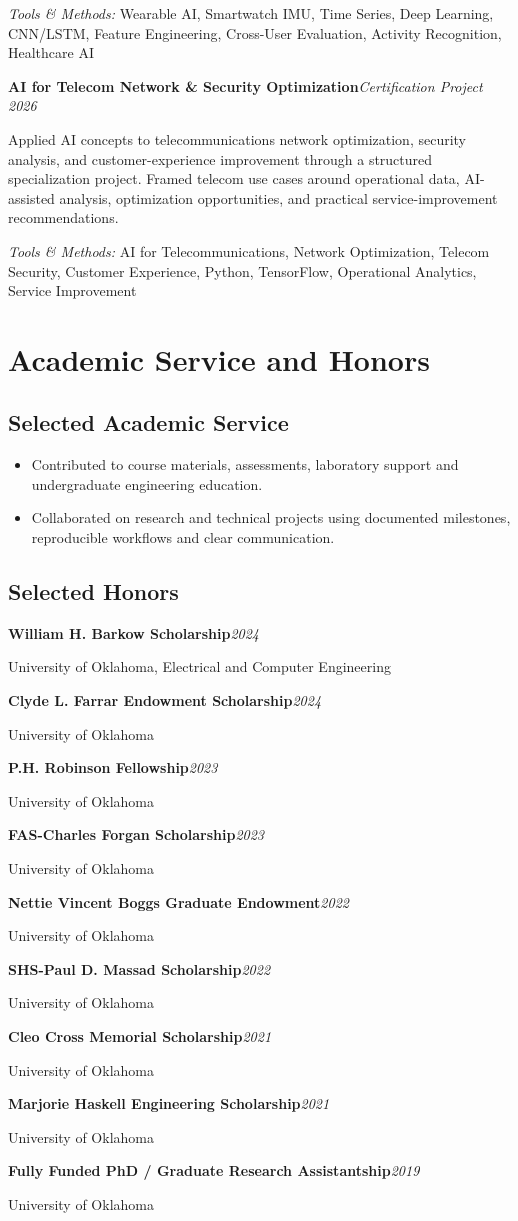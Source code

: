 \documentclass[8pt,letterpaper]{extarticle}
\newcommand{\entry}[2]{\Needspace{4\baselineskip}\textbf{#1}\hfill\textit{#2}\par}
\begin{document}
{\small\textit{Tools \& Methods:} Wearable AI, Smartwatch IMU, Time Series, Deep Learning, CNN/LSTM, Feature Engineering, Cross-User Evaluation, Activity Recognition, Healthcare AI\par}
\vspace{1pt}
\entry{AI for Telecom Network \& Security Optimization}{Certification Project \textbar{} 2026}
Applied AI concepts to telecommunications network optimization, security analysis, and customer-experience improvement through a structured specialization project. Framed telecom use cases around operational data, AI-assisted analysis, optimization opportunities, and practical service-improvement recommendations.\par
{\small\textit{Tools \& Methods:} AI for Telecommunications, Network Optimization, Telecom Security, Customer Experience, Python, TensorFlow, Operational Analytics, Service Improvement\par}
\vspace{1pt}
\section{Academic Service and Honors}
\subsection{Selected Academic Service}
\begin{itemize}
\item Contributed to course materials, assessments, laboratory support and undergraduate engineering education.
\item Collaborated on research and technical projects using documented milestones, reproducible workflows and clear communication.
\end{itemize}
\subsection{Selected Honors}
\entry{William H. Barkow Scholarship}{2024}
{\small University of Oklahoma, Electrical and Computer Engineering\par}
\entry{Clyde L. Farrar Endowment Scholarship}{2024}
{\small University of Oklahoma\par}
\entry{P.H. Robinson Fellowship}{2023}
{\small University of Oklahoma\par}
\entry{FAS-Charles Forgan Scholarship}{2023}
{\small University of Oklahoma\par}
\entry{Nettie Vincent Boggs Graduate Endowment}{2022}
{\small University of Oklahoma\par}
\entry{SHS-Paul D. Massad Scholarship}{2022}
{\small University of Oklahoma\par}
\entry{Cleo Cross Memorial Scholarship}{2021}
{\small University of Oklahoma\par}
\entry{Marjorie Haskell Engineering Scholarship}{2021}
{\small University of Oklahoma\par}
\entry{Fully Funded PhD / Graduate Research Assistantship}{2019}
{\small University of Oklahoma\par}
\end{document}
